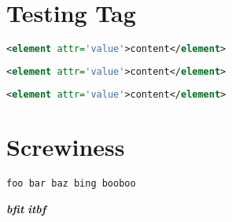 \documentclass{article}
\begin{document}
\section{Testing Tag}
\begin{lstlisting}[language=XML,tagstyle=\bf]
<element attr='value'>content</element>
\end{lstlisting}
\begin{lstlisting}[language=XML,tagstyle=\bf,usekeywordsintag=false]
<element attr='value'>content</element>
\end{lstlisting}
\begin{lstlisting}[language=XML,tagstyle=\bf,markfirstintag]
<element attr='value'>content</element>
\end{lstlisting}

\section{Screwiness}
\begin{lstlisting}[language=bingo,keywordstyle=\bfseries,keywordstyle={[2]\itshape},index={[1][keywords2]{bar,baz}}]
foo bar baz bing booboo
\end{lstlisting}
{\bfseries\itshape bfit}
{\itshape\bfseries itbf}
\printindex
\end{document}
